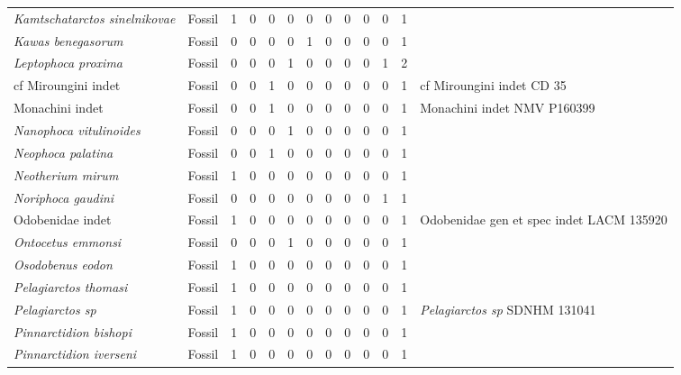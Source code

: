 \begin{longtable}{llccccccccccp{}}
\textit{Kamtschatarctos sinelnikovae} &
Fossil &
1 &
0 &
0 &
0 &
0 &
0 &
0 &
0 &
0 &
1 &
\\

\textit{Kawas benegasorum} &
Fossil &
0 &
0 &
0 &
0 &
1 &
0 &
0 &
0 &
0 &
1 &
\\

\textit{Leptophoca proxima} &
Fossil &
0 &
0 &
0 &
1 &
0 &
0 &
0 &
0 &
1 &
2 &
\\

cf Miroungini indet &
Fossil &
0 &
0 &
1 &
0 &
0 &
0 &
0 &
0 &
0 &
1 &
cf Miroungini indet CD 35\\

Monachini indet &
Fossil &
0 &
0 &
1 &
0 &
0 &
0 &
0 &
0 &
0 &
1 &
Monachini indet NMV P160399\\

\textit{Nanophoca vitulinoides} &
Fossil &
0 &
0 &
0 &
1 &
0 &
0 &
0 &
0 &
0 &
1 &
\\

\textit{Neophoca palatina} &
Fossil &
0 &
0 &
1 &
0 &
0 &
0 &
0 &
0 &
0 &
1 &
\\

\textit{Neotherium mirum} &
Fossil &
1 &
0 &
0 &
0 &
0 &
0 &
0 &
0 &
0 &
1 &
\\

\textit{Noriphoca gaudini} &
Fossil &
0 &
0 &
0 &
0 &
0 &
0 &
0 & 
0 &
1 &
1 &
\\

Odobenidae indet &
Fossil &
1 &
0 &
0 &
0 &
0 &
0 &
0 &
0 &
0 &
1 &
Odobenidae gen et spec indet LACM 135920\\

\textit{Ontocetus emmonsi} &
Fossil &
0 &
0 &
0 &
1 &
0 &
0 &
0 &
0 &
0 &
1 &
\\

\textit{Osodobenus eodon} &
Fossil &
1 &
0 &
0 &
0 &
0 &
0 &
0 &
0 &
0 &
1 &
\\

\textit{Pelagiarctos thomasi} &
Fossil &
1 &
0 &
0 &
0 &
0 &
0 &
0 &
0 &
0 &
1 &
\\

\textit{Pelagiarctos sp} &
Fossil &
1 &
0 &
0 &
0 &
0 &
0 &
0 &
0 &
0 &
1 &
\textit{Pelagiarctos sp} SDNHM 131041\\

\textit{Pinnarctidion bishopi} &
Fossil &
1 &
0 &
0 &
0 &
0 &
0 &
0 &
0 &
0 &
1 &
\\

\textit{Pinnarctidion iverseni} &
Fossil &
1 &
0 &
0 &
0 &
0 &
0 &
0 &
0 &
0 &
1 &
\\


\end{longtable}

